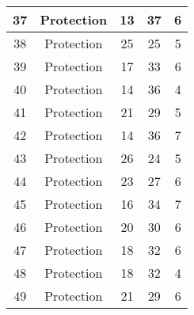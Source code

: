 \documentclass[results.tex]{subfiles}
\begin{document}
\begin{center}
\begin{tabular}{| c || c | c | c | c |}
            \hline
            37                      & Protection                   & 13                     & 37                      & 6                    \\
            \hline
            38                      & Protection                   & 25                     & 25                      & 5                    \\
            \hline
            39                      & Protection                   & 17                     & 33                      & 6                    \\
            \hline
            40                      & Protection                   & 14                     & 36                      & 4                    \\
            \hline
            41                      & Protection                   & 21                     & 29                      & 5                    \\
            \hline
            42                      & Protection                   & 14                     & 36                      & 7                    \\
            \hline
            43                      & Protection                   & 26                     & 24                      & 5                    \\
            \hline
            44                      & Protection                   & 23                     & 27                      & 6                    \\
            \hline
            45                      & Protection                   & 16                     & 34                      & 7                    \\
            \hline
            46                      & Protection                   & 20                     & 30                      & 6                    \\
            \hline
            47                      & Protection                   & 18                     & 32                      & 6                    \\
            \hline
            48                      & Protection                   & 18                     & 32                      & 4                    \\
            \hline
            49                      & Protection                   & 21                     & 29                      & 6                    \\
            \hline
        \end{tabular}
    \end{center}
\end{document}
